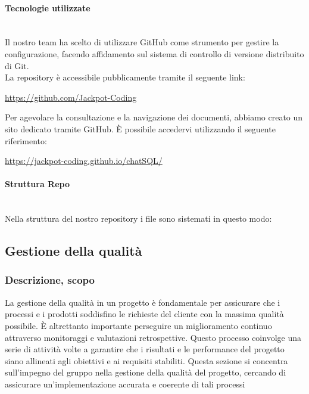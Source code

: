 \documentclass{article}
\begin{document}
    \paragraph{Tecnologie utilizzate}~\\
    Il nostro team ha scelto di utilizzare GitHub come strumento per gestire la configurazione, facendo affidamento sul sistema di controllo di versione distribuito di Git.\\
    La repository è accessibile pubblicamente tramite il seguente link:\\
    \begin{center}
    \url{https://github.com/Jackpot-Coding}\\
    \end{center}
    Per agevolare la consultazione e la navigazione dei documenti, abbiamo creato un sito dedicato tramite GitHub. È possibile accedervi utilizzando il seguente riferimento:\\
    \begin{center}
    \url{https://jackpot-coding.github.io/chatSQL/}\\
    \end{center}
    \paragraph{Struttura Repo}~\\
    Nella struttura del nostro repository i file sono sistemati in questo modo:\\
    


\subsection{Gestione della qualità}
    \subsubsection{Descrizione, scopo}
    La gestione della qualità in un progetto è fondamentale per assicurare che i processi e i prodotti soddisfino le richieste del cliente con la massima qualità possibile. È altrettanto importante perseguire un miglioramento continuo attraverso monitoraggi e valutazioni retrospettive. Questo processo coinvolge una serie di attività volte a garantire che i risultati e le performance del progetto siano allineati agli obiettivi e ai requisiti stabiliti. Questa sezione si concentra sull'impegno del gruppo nella gestione della qualità del progetto, cercando di assicurare un'implementazione accurata e coerente di tali processi
\end{document}
